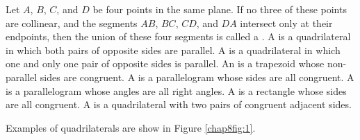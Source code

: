 \begin{definition}[Quadrilaterals]
Let $A$, $B$, $C$, and $D$ be four points in the same plane. If no three of these points are
collinear, and the segments $AB$, $BC$, $CD$, and $DA$ intersect only at their endpoints, then the union
of these four segments is called a . A  is a quadrilateral in which both pairs of opposite sides are parallel. A  is a quadrilateral in which one and only one pair of opposite sides is parallel. An  is a trapezoid whose non-parallel sides are congruent. A  is a parallelogram whose sides are all congruent. A  is a parallelogram whose angles are all right angles. A  is a rectangle whose sides are all congruent. A  is a quadrilateral with two pairs of congruent adjacent sides.
\end{definition}
Examples of quadrilaterals are show in Figure \eqref{chap8fig:1}.
